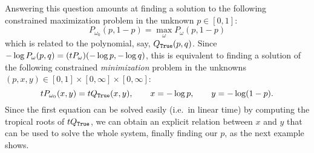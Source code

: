 Answering this question amounts at finding a solution to the following constrained maximization problem in the unknown $p\in[0,1]$:
%
%
%
%
\[
P_{\omega_0}(p,1-p) = \max_\omega P_{\omega}(p,1-p)
\]
which is related to the polynomial, say, $Q_{\mathtt{True}}(p,q)$.
Since $-\log P_\omega(p,q)=(\trop P_{\omega})(-\log p,-\log q)$, this is equivalent
 to finding a solution of the following constrained \emph{minimization} problem in the unknowns $(p,x,y)\in[0,1]\times[0,\infty]\times[0,\infty]$:
\begin{equation}\label{eq:troproot}
\trop P_{\omega_{0}} (x,y)= \trop Q_{\true}(x,y) , \qquad x= -\log p,\qquad y=-\log(1-p).
\end{equation}
Since the first equation can be solved easily (i.e.~in linear time) by computing the tropical roots of $\trop Q_{\true}$, we can obtain an explicit relation between $x$ and $y$ that can be used to solve the whole system, finally finding our $p$, as the next example shows.
